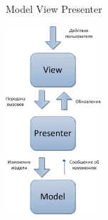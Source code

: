 \begin{frame}[fragile]{Model View Presenter}
  \begin{center}
    \includegraphics[height=7cm,keepaspectratio]{sources/images/mvp.png}
  \end{center}
\end{frame}